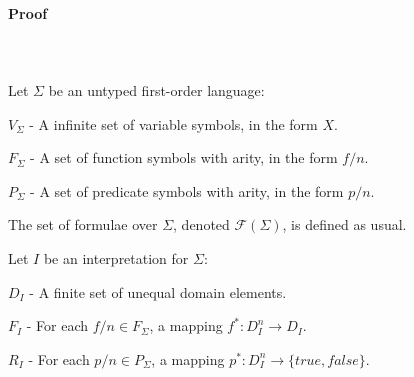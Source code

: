 \documentclass[letterpaper]{article}
\newenvironment{packed_itemize}{
\vspace*{-0.2em}
\begin{itemize}
\setlength{\partopsep}{0pt}
\setlength{\itemsep}{1pt}
\setlength{\parskip}{0pt}
\setlength{\parsep}{0pt}
}{\end{itemize}}
\newcommand{\true}{{\mathit{true}}}
\newcommand{\false}{{\mathit{false}}}
\begin{document}
\paragraph{Proof}
~\\
~\\
Let $\Sigma$ be an untyped first-order language:
\begin{packed_itemize}
\item $V_\Sigma$ - A infinite set of variable symbols, in the form $X$.
\item $F_\Sigma$ - A set of function symbols with arity, in the form $f/n$.
\item $P_\Sigma$ - A set of predicate symbols with arity, in the form $p/n$.
\end{packed_itemize}
The set of formulae over $\Sigma$, denoted $\mathcal{F}(\Sigma)$, is defined as usual. 

\noindent
Let $I$ be an interpretation for $\Sigma$:
\begin{packed_itemize}
\item $D_I$ - A finite set of unequal domain elements.
\item $F_I$ - For each $f/n \in F_\Sigma$, a mapping $f^*: D_I^n \rightarrow D_I$.
\item $R_I$ - For each $p/n \in P_\Sigma$, a mapping $p^*: D_I^n \rightarrow \{\true,\false\}$.
\end{packed_itemize}
\end{document}
